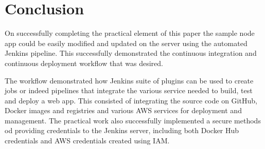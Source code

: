 \section{Conclusion}
On successfully completing the practical element of this paper the sample node app could be easily modified and updated on the server using the automated Jenkins pipeline. This successfully demonstrated the continuous integration and continuous deployment workflow that was desired.

The workflow demonstrated how Jenkins suite of plugins can be used to create jobs or indeed pipelines that integrate the various service needed to build, test and deploy a web app. This consisted of integrating the source code on GitHub, Docker images and registries and various AWS services for deployment and management. The practical work also successfully implemented a secure methods od providing credentials to the Jenkins server, including both Docker Hub credentials and AWS credentials created using IAM.

